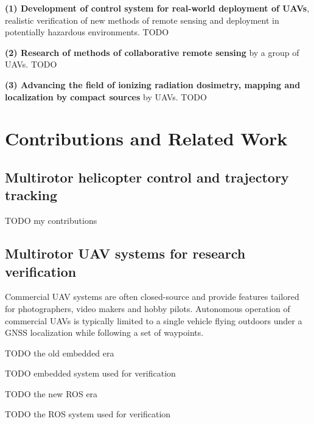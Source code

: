 \documentclass[a4paper,11pt,titlepage,twoside]{book}
\newcommand{\todo}[1]{{\color{red} TODO {#1}}}
\newcommand{\chapternoclear}[1]{
  \begingroup
  \let\cleardoublepage\clearpage
  \chapter{#1}
  \endgroup
}
\begin{document}
\textbf{(1) Development of control system for real-world deployment of \acp{UAV}}, realistic verification of new methods of remote sensing and deployment in potentially hazardous environments.
\todo{}

\textbf{(2) Research of methods of collaborative remote sensing} by a group of \aclp{UAV}.
\todo{}

\textbf{(3) Advancing the field of ionizing radiation dosimetry, mapping and localization by compact sources} by \aclp{UAV}.
\todo{}




\chapternoclear{Contributions and Related Work}

\section{Multirotor helicopter control and trajectory tracking}

\todo{my contributions}
\cite{baca2016embedded} %
\cite{baca2018model} %
\cite{baca2020mrs} %

\section{Multirotor UAV systems for research verification}

Commercial \ac{UAV} systems are often closed-source and provide features tailored for photographers, video makers and hobby pilots.
Autonomous operation of commercial \acp{UAV} is typically limited to a single vehicle flying outdoors under a \ac{GNSS} localization while following a set of waypoints.

\todo{the old embedded era}
\cite{baca2016embedded} %
\cite{saska2017system} %

\todo{embedded system used for verification}
\cite{spurny2016complex} %
\cite{chudoba2016exploration} %
\cite{saska2016formations} %

\todo{the new ROS era}
\cite{baca2018model}
\cite{baca2020mrs}

\todo{the ROS system used for verification}
\cite{saska2017documentation}
\cite{faigl2017onsolution}
\cite{giernacki2019realtime}
\cite{petracek2020bioinspired}
\cite{saska2020formation}
\cite{saikin2020wildfire}
\end{document}
